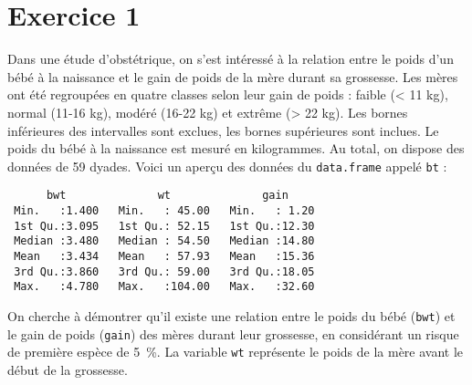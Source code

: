 \documentclass[11pt]{report}
\theoremstyle{definition}
\begin{document}
\section*{Exercice 1}
Dans une étude d'obstétrique, on s'est intéressé à la relation entre le
poids d'un bébé à la naissance et le gain de poids de la mère durant sa
grossesse. Les mères ont été regroupées en quatre classes selon leur gain de
poids : faible (< 11 kg), normal (11-16 kg), modéré (16-22 kg) et extrême (>
22 kg). Les bornes inférieures des intervalles sont exclues, les bornes
supérieures sont inclues. Le poids du bébé à la naissance est mesuré en
kilogrammes. Au total, on dispose des données de 59 dyades. Voici un aperçu
des données du \texttt{data.frame} appelé \texttt{bt} :
\begin{verbatim}
      bwt              wt              gain      
 Min.   :1.400   Min.   : 45.00   Min.   : 1.20  
 1st Qu.:3.095   1st Qu.: 52.15   1st Qu.:12.30  
 Median :3.480   Median : 54.50   Median :14.80  
 Mean   :3.434   Mean   : 57.93   Mean   :15.36  
 3rd Qu.:3.860   3rd Qu.: 59.00   3rd Qu.:18.05  
 Max.   :4.780   Max.   :104.00   Max.   :32.60
\end{verbatim}
On cherche à démontrer qu'il existe une relation entre le poids du bébé
(\texttt{bwt}) et le gain de poids (\texttt{gain}) des mères durant
leur grossesse, en considérant un risque de première espèce de 5~\%. La
variable \texttt{wt} représente le poids de la mère avant le début de la
grossesse.  
\end{document}
